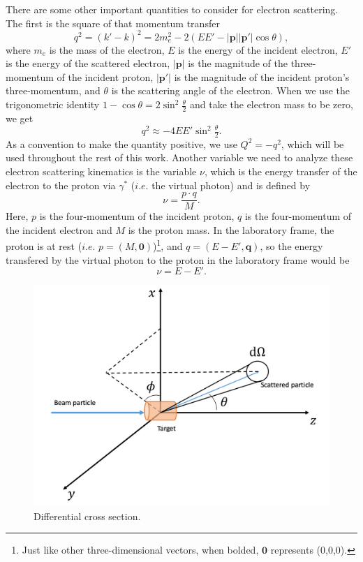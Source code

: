 There are some other important quantities to consider for electron scattering. The first is the square of that momentum transfer
\begin{equation}
q^2 = (k' - k)^2 = 2m_e^2 - 2(EE' - |\mathbf{p}||\mathbf{p}'| \cos \theta),
\end{equation}
where $m_e$ is the mass of the electron, $E$ is the energy of the incident electron, $E'$ is the energy of the scattered electron, $|\mathbf{p}|$ is the magnitude of the three-momentum of the incident proton, $|\mathbf{p}'|$ is the magnitude of the incident proton's three-momentum, and $\theta$ is the scattering angle of the electron. When we use the trigonometric identity $1-\cos \theta = 2 \sin^2 \tfrac{\theta}{2}$ and take the electron mass to be zero, we get
\begin{equation}
q^2 \approx -4EE'\sin^2\tfrac{\theta}{2}.
\end{equation}
As a convention to make the quantity positive, we use $Q^2 = -q^2$, which will be used throughout the rest of this work. Another variable we need to analyze these electron scattering kinematics is the variable $\nu$, which is the energy transfer of the electron to the proton via $\gamma^*$ ($i.e.$ the virtual photon) and is defined by
\begin{equation}
\nu = \frac{p \cdot q}{M}.
\end{equation}
Here, $p$ is the four-momentum of the incident proton, $q$ is the four-momentum of the incident electron and $M$ is the proton mass. In the laboratory frame, the proton is at rest ($i.e.$ $p=(M,\mathbf{0})$)\footnote{Just like other three-dimensional vectors, when bolded, $\mathbf{0}$ represents (0,0,0).}, and $q=(E-E',\mathbf{q})$, so the energy transfered by the virtual photon to the proton in the laboratory frame would be
\begin{equation}
\nu  = E-E'.
\end{equation}

\begin{figure}[h!]
	\centering
	\includegraphics[width=0.6\linewidth]{figures/diff_xsec.png}
	\caption{Differential cross section.}
	\label{fig:diff_xsec}
\end{figure}

